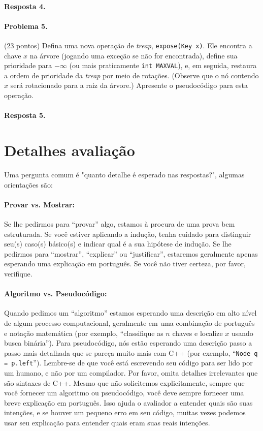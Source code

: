 \documentclass{article}
\begin{document}
\paragraph{Resposta 4.}

\paragraph{Problema 5.} (23 pontos)
Defina uma nova operação de \textit{treap}, \texttt{expose(Key x)}. Ele encontra a chave $x$ na árvore (jogando
uma exceção se não for encontrada), define sua prioridade para $-\infty$ (ou mais praticamente \texttt{int MAXVAL}),
e, em seguida, restaura a ordem de prioridade da \textit{treap} por meio de rotações. (Observe que o nó contendo $x$ será rotacionado para a raiz da árvore.) Apresente o pseudocódigo para esta operação.

\paragraph{Resposta 5.}

\section{Detalhes avaliação}
Uma pergunta comum é "quanto detalhe é esperado nas respostas?", algumas orientações são:
%
\paragraph{Provar vs. Mostrar:}
Se lhe pedirmos para “provar” algo, estamos à procura de uma prova bem estruturada. Se você estiver aplicando a indução, tenha cuidado para distinguir seu(s) caso(s) básico(s) e indicar qual é a sua hipótese de indução. Se lhe pedirmos para “mostrar”, “explicar” ou “justificar”, estaremos geralmente apenas esperando uma explicação em português. Se você não tiver certeza, por favor, verifique.

\paragraph{Algoritmo vs. Pseudocódigo:} Quando pedimos um “algoritmo” estamos esperando uma descrição em alto nível de algum processo computacional, geralmente em uma combinação de português e notação matemática (por exemplo, “classifique as $n$ chaves e localize $x$ usando busca binária”). Para pseudocódigo, nós estão esperando uma descrição passo a passo mais detalhada que se pareça muito mais com C++ (por exemplo, “\texttt{Node q = p.left}”). Lembre-se de que você está escrevendo seu código para ser lido por um humano, e não por um compilador. Por favor, omita detalhes irrelevantes que são sintaxes de C++. Mesmo que não solicitemos explicitamente, sempre que você fornecer um algoritmo ou pseudocódigo, você deve sempre fornecer uma breve explicação em português. Isso ajuda o avaliador a entender quais são suas intenções, e se houver um pequeno erro em seu código, muitas vezes podemos usar seu explicação para entender quais eram suas reais intenções.
\end{document}
